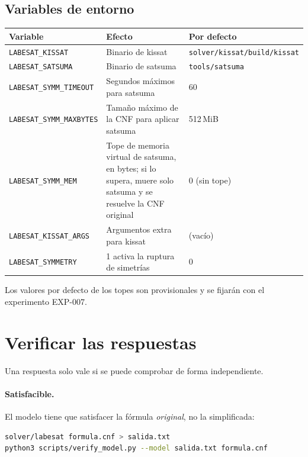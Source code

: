 \documentclass[11pt,a4paper]{article}
\begin{document}
\subsection{Variables de entorno}\label{sec:entorno}
\begin{center}
\begin{tabularx}{\linewidth}{@{}lXl@{}}
\toprule
Variable & Efecto & Por defecto \\
\midrule
\texttt{LABESAT\_KISSAT} & Binario de kissat & \texttt{solver/kissat/build/kissat} \\
\texttt{LABESAT\_SATSUMA} & Binario de satsuma & \texttt{tools/satsuma} \\
\texttt{LABESAT\_SYMM\_TIMEOUT} & Segundos máximos para satsuma & 60 \\
\texttt{LABESAT\_SYMM\_MAXBYTES} & Tamaño máximo de la CNF para aplicar satsuma & 512\,MiB \\
\texttt{LABESAT\_SYMM\_MEM} & Tope de memoria virtual de satsuma, en bytes; si lo supera, muere solo satsuma y se resuelve la CNF original & 0 (sin tope) \\
\texttt{LABESAT\_KISSAT\_ARGS} & Argumentos extra para kissat & (vacío) \\
\texttt{LABESAT\_SYMMETRY} & 1 activa la ruptura de simetrías & 0 \\
\bottomrule
\end{tabularx}
\end{center}
Los valores por defecto de los topes son provisionales y se fijarán con el
experimento EXP-007.

\section{Verificar las respuestas}

Una respuesta solo vale si se puede comprobar de forma independiente.

\paragraph{Satisfacible.} El modelo tiene que satisfacer la fórmula
\emph{original}, no la simplificada:
\begin{lstlisting}[language=bash]
solver/labesat formula.cnf > salida.txt
python3 scripts/verify_model.py --model salida.txt formula.cnf
\end{lstlisting}
\end{document}
